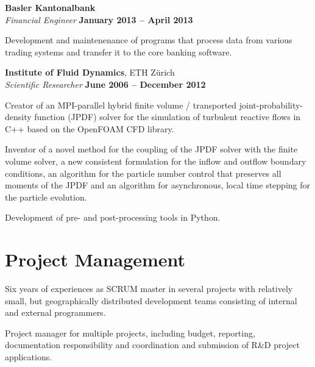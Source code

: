 \documentclass[line,11pt,a4paper]{../resume}
\begin{document}
\begin{resume}
\textbf{Basler Kantonalbank} \vspace{2mm}\\\vspace{1mm}%
\textsl{Financial Engineer} \hfill \textbf{January 2013 -- April 2013}\\
\begin{list2}
  \item Development and maintenenance of programs that process data from
    various trading systems and transfer it to the core banking software.
\end{list2}

\textbf{Institute of Fluid Dynamics}, ETH Z\"urich \vspace{2mm}\\\vspace{1mm}%
\textsl{Scientific Researcher} \hfill \textbf{June 2006 -- December 2012}\\
\begin{list2}
  \item Creator of an MPI-parallel hybrid finite volume / transported
    joint-probability-density function (JPDF) solver for the simulation of
    turbulent reactive flows in C++ based on the OpenFOAM CFD library.

  \item Inventor of a novel method for the coupling of the JPDF solver with the
    finite volume solver, a new consistent formulation for the inflow and
    outflow boundary conditions, an algorithm for the particle number control
    that preserves all moments of the JPDF and an algorithm for asynchronous,
    local time stepping for the particle evolution.

  \item Development of pre- and post-processing tools in Python.
\end{list2}

\section{\mysidestyle Project Management}\vspace{6mm}
\begin{list2}
  \item Six years of experiences as SCRUM master in several projects with
    relatively small, but geographically distributed development teams
    consisting of internal and external programmers.

  \item Project manager for multiple projects, including budget, reporting,
    documentation responsibility and coordination and submission of R\&D
    project applications.
\end{list2}


\end{resume}
\end{document}
